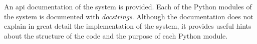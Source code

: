 
An \gls{api} documentation of the system is
provided.
Each of the Python modules of the system is documented with
\emph{docstrings}.
Although the documentation does not explain in great detail
the implementation of the system, it provides useful hints
about the structure of the code and the purpose of each
Python module.
